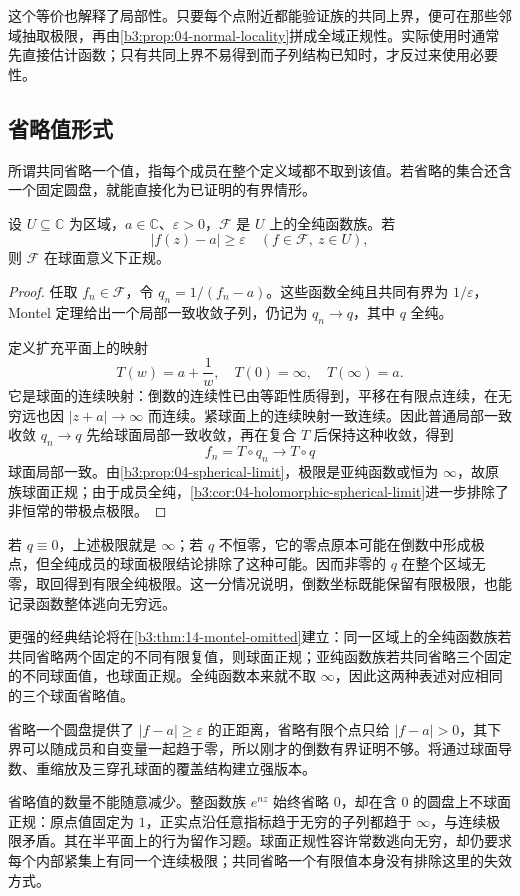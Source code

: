这个等价也解释了局部性。只要每个点附近都能验证族的共同上界，便可在那些邻域抽取极限，再由\cref{b3:prop:04-normal-locality}拼成全域正规性。实际使用时通常先直接估计函数；只有共同上界不易得到而子列结构已知时，才反过来使用必要性。

\subsection{省略值形式}
\label{b3:subsec:040303}

所谓共同省略一个值，指每个成员在整个定义域都不取到该值。若省略的集合还含一个固定圆盘，就能直接化为已证明的有界情形。

\begin{proposition}\label{b3:prop:04-omitted-disk}
设 \(U\subseteq\mathbb C\) 为区域，\(a\in\mathbb C\)、\(\varepsilon>0\)，\(\mathcal F\) 是 \(U\) 上的全纯函数族。若
\[
 |f(z)-a|\ge\varepsilon
 \quad(f\in\mathcal F,\ z\in U),
\]
则 \(\mathcal F\) 在球面意义下正规。
\end{proposition}
\begin{proof}
任取 \(f_n\in\mathcal F\)，令 \(q_n=1/(f_n-a)\)。这些函数全纯且共同有界为 \(1/\varepsilon\)，Montel 定理给出一个局部一致收敛子列，仍记为 \(q_n\to q\)，其中 \(q\) 全纯。

定义扩充平面上的映射
\[
 T(w)=a+\frac1w,\quad T(0)=\infty,\quad T(\infty)=a.
\]
它是球面的连续映射：倒数的连续性已由等距性质得到，平移在有限点连续，在无穷远也因 \(|z+a|\to\infty\) 而连续。紧球面上的连续映射一致连续。因此普通局部一致收敛 \(q_n\to q\) 先给球面局部一致收敛，再在复合 \(T\) 后保持这种收敛，得到
\[
 f_n=T\circ q_n\longrightarrow T\circ q
\]
球面局部一致。由\cref{b3:prop:04-spherical-limit}，极限是亚纯函数或恒为 \(\infty\)，故原族球面正规；由于成员全纯，\cref{b3:cor:04-holomorphic-spherical-limit}进一步排除了非恒常的带极点极限。
\end{proof}

若 \(q\equiv0\)，上述极限就是 \(\infty\)；若 \(q\) 不恒零，它的零点原本可能在倒数中形成极点，但全纯成员的球面极限结论排除了这种可能。因而非零的 \(q\) 在整个区域无零，取回得到有限全纯极限。这一分情况说明，倒数坐标既能保留有限极限，也能记录函数整体逃向无穷远。

\ProseParagraphBreak

更强的经典结论将在\cref{b3:thm:14-montel-omitted}建立：同一区域上的全纯函数族若共同省略两个固定的不同有限复值，则球面正规；亚纯函数族若共同省略三个固定的不同球面值，也球面正规。全纯函数本来就不取 \(\infty\)，因此这两种表述对应相同的三个球面省略值。

\ProseParagraphBreak

省略一个圆盘提供了 \(|f-a|\ge\varepsilon\) 的正距离，省略有限个点只给 \(|f-a|>0\)，其下界可以随成员和自变量一起趋于零，所以刚才的倒数有界证明不够。将通过球面导数、重缩放及三穿孔球面的覆盖结构建立强版本。

\ProseParagraphBreak

省略值的数量不能随意减少。整函数族 \(e^{nz}\) 始终省略 \(0\)，却在含 \(0\) 的圆盘上不球面正规：原点值固定为 \(1\)，正实点沿任意指标趋于无穷的子列都趋于 \(\infty\)，与连续极限矛盾。其在半平面上的行为留作习题。球面正规性容许常数逃向无穷，却仍要求每个内部紧集上有同一个连续极限；共同省略一个有限值本身没有排除这里的失效方式。
